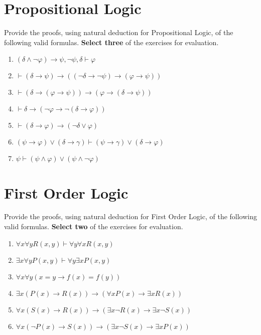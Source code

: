 \documentclass[11pt]{article}
\begin{document}
\section{Propositional Logic}

\begin{myExercise}
  Provide the proofs, using natural deduction for Propositional Logic, of the following valid formulas. \textbf{Select three} of the exercises for evaluation.
  
  \begin{enumerate}[label=(\alph*)]
    \item $(\delta \land \neg\varphi) \to \psi, \neg\psi, \delta \vdash \varphi$
    \item $\vdash (\delta \to \psi) \to ((\neg\delta \to \neg\psi) \to (\varphi \to \psi))$
    \item $\vdash (\delta \to (\varphi \to \psi)) \to (\varphi \to (\delta \to \psi))$
    \item $\vdash \delta \to (\neg\varphi \to \neg(\delta \to \varphi))$
    \item $\vdash (\delta \to \varphi) \to (\neg\delta \lor \varphi)$
    \item $(\psi \to \varphi) \lor (\delta \to \gamma) \vdash (\psi \to \gamma) \lor (\delta \to \varphi)$
    \item $\psi \vdash (\psi \land \varphi) \lor (\psi \land \neg\varphi)$

  \end{enumerate}

\end{myExercise}

\section{First Order Logic}

\begin{myExercise}
 Provide the proofs, using natural deduction for First Order Logic, of the following valid formulas. \textbf{Select two} of the exercises for evaluation.
  
  \begin{enumerate}[label=(\alph*)]
    \item $\forall x \forall y R(x,y) \vdash \forall y\forall x R(x,y)$
    \item $\exists x\forall y P(x,y) \vdash \forall y\exists x P(x,y)$
    \item $\forall x\forall y (x = y \to f(x) = f(y))$
    \item $\exists x (P(x) \to R(x)) \to (\forall x P(x) \to \exists x R(x))$
    \item $\forall x(S(x) \to R(x)) \to (\exists x\neg R(x) \to \exists x\neg S(x))$
    \item $\forall x (\neg P(x) \to S(x)) \to (\exists x \neg S(x) \to \exists x P(x))$

  \end{enumerate}

\end{myExercise}
 
\end{document}
